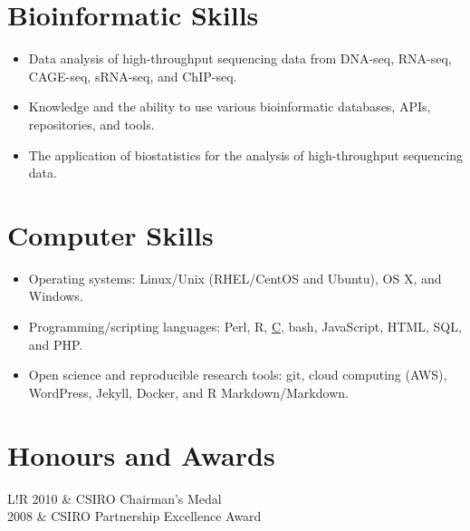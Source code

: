 \documentclass[a4paper, 10pt]{article}
\newcommand\VRule{\color{lightgray}\vrule width 0.5pt}
\begin{document}
\section*{Bioinformatic Skills}

\begin{itemize}
   \setlength\itemsep{0em}
   \item Data analysis of high-throughput sequencing data from DNA-seq, RNA-seq, CAGE-seq, sRNA-seq, and ChIP-seq.
   \item Knowledge and the ability to use various bioinformatic databases, APIs, repositories, and tools.
   \item The application of biostatistics for the analysis of high-throughput sequencing data.
\end{itemize}

\section*{Computer Skills}

\begin{itemize}
   \setlength\itemsep{0em}
   \item Operating systems: Linux/Unix (RHEL/CentOS and Ubuntu), OS X, and Windows.
   \item Programming/scripting languages: Perl, R, \href{https://github.com/davetang/getting_started_with_c}{C}, bash, JavaScript, HTML, SQL, and PHP.
   \item Open science and reproducible research tools: git, cloud computing (AWS), WordPress, Jekyll, Docker, and R Markdown/Markdown.
\end{itemize}

\section*{Honours and Awards}
\begin{tabular}{L!{\VRule}R}
   2010 & CSIRO Chairman's Medal \\
   2008 & CSIRO Partnership Excellence Award \\
\end{tabular}
\end{document}
